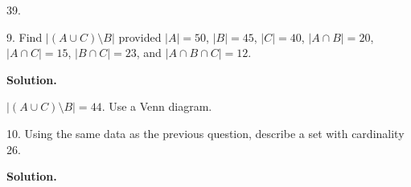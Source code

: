 \documentclass[10pt,]{book}
\theoremstyle{plain}
\theoremstyle{definition}
\theoremstyle{definition}
\theoremstyle{definition}
\numberwithin{equation}{section}
\begin{document}
\begin{exerciselist}
39.
%
\item[9.]\hypertarget{exercise-50}{}
Find \(|(A \cup C)\setminus B|\) provided \(|A| = 50\), \(|B| = 45\), \(|C| = 40\), \(|A\cap B| = 20\), \(|A \cap C| = 15\), \(|B \cap C| = 23\), and \(|A \cap B \cap C| = 12\).
%
\par\smallskip
\par\smallskip
\noindent\textbf{Solution.}\hypertarget{solution-73}{}\quad

\(|(A \cup C)\setminus B| = 44\). Use a Venn diagram.
%
\item[10.]\hypertarget{exercise-51}{}
Using the same data as the previous question, describe a set with cardinality 26.
%
\par\smallskip
\par\smallskip
\noindent\textbf{Solution.}\hypertarget{solution-74}{}\quad


\end{exerciselist}
\end{document}
